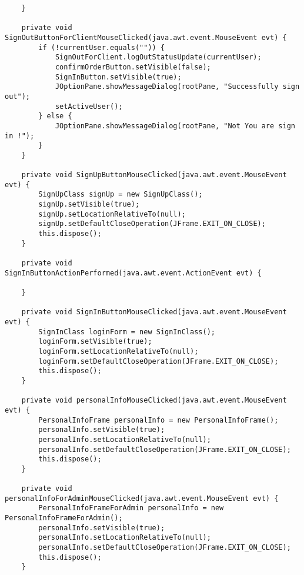\documentclass[12pt,a4paper]{article}
\begin{document}
\begin{lstlisting}
    }                                               

    private void SignOutButtonForClientMouseClicked(java.awt.event.MouseEvent evt) {                                                    
        if (!currentUser.equals("")) {
            SignOutForClient.logOutStatusUpdate(currentUser);
            confirmOrderButton.setVisible(false);
            SignInButton.setVisible(true);
            JOptionPane.showMessageDialog(rootPane, "Successfully sign out");
            setActiveUser();
        } else {
            JOptionPane.showMessageDialog(rootPane, "Not You are sign in !");
        }
    }                                                   

    private void SignUpButtonMouseClicked(java.awt.event.MouseEvent evt) {                                          
        SignUpClass signUp = new SignUpClass();
        signUp.setVisible(true);
        signUp.setLocationRelativeTo(null);
        signUp.setDefaultCloseOperation(JFrame.EXIT_ON_CLOSE);
        this.dispose();
    }                                         

    private void SignInButtonActionPerformed(java.awt.event.ActionEvent evt) {                                             

    }                                            

    private void SignInButtonMouseClicked(java.awt.event.MouseEvent evt) {                                          
        SignInClass loginForm = new SignInClass();
        loginForm.setVisible(true);
        loginForm.setLocationRelativeTo(null);
        loginForm.setDefaultCloseOperation(JFrame.EXIT_ON_CLOSE);
        this.dispose();
    }                                         

    private void personalInfoMouseClicked(java.awt.event.MouseEvent evt) {                                          
        PersonalInfoFrame personalInfo = new PersonalInfoFrame();
        personalInfo.setVisible(true);
        personalInfo.setLocationRelativeTo(null);
        personalInfo.setDefaultCloseOperation(JFrame.EXIT_ON_CLOSE);
        this.dispose();
    }                                         

    private void personalInfoForAdminMouseClicked(java.awt.event.MouseEvent evt) {                                                  
        PersonalInfoFrameForAdmin personalInfo = new PersonalInfoFrameForAdmin();
        personalInfo.setVisible(true);
        personalInfo.setLocationRelativeTo(null);
        personalInfo.setDefaultCloseOperation(JFrame.EXIT_ON_CLOSE);
        this.dispose();
    }                                                 


\end{lstlisting}
\end{document}
